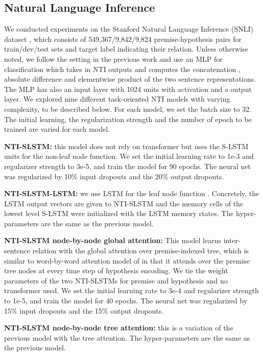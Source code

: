 \documentclass[11pt]{article}
\begin{document}
\subsection{Natural Language Inference}

We conducted experiments on the Stanford Natural Language Inference (SNLI) dataset \cite{bowman:15}, which consists of 549,367/9,842/9,824 premise-hypothesis pairs for train/dev/test sets and target label indicating their relation. Unless otherwise noted, we follow the setting in the previous work \cite{Lili16,BowmanGRGMP16} and use an MLP 
for classification which takes in NTI outputs and computes the concatenation , absolute difference  and elementwise product  of the two sentence representations. The MLP has also an input layer with 1024 units with  activation and a  output layer. We explored nine different task-oriented NTI models with varying complexity, to be described below. For each model, we set the batch size to 32. The initial learning, the regularization strength and the number of epoch to be trained are varied for each model.

\textbf{NTI-SLSTM:} this model does not rely on  transformer but uses the S-LSTM units for the non-leaf node function. We set the initial learning rate to 1e-3 and  regularizer strength to 3e-5, and train the model for 90 epochs. The neural net was regularized by 10\% input dropouts and the 20\% output dropouts. 

\textbf{NTI-SLSTM-LSTM:} we use LSTM for the leaf node function . Concretely, the LSTM output vectors are given to NTI-SLSTM and the memory cells of the lowest level S-LSTM were initialized with the LSTM memory states. The hyper-parameters are the same as the previous model.





\textbf{NTI-SLSTM node-by-node global attention:} This model learns inter-sentence relation with the global attention over premise-indexed tree, which is similar to word-by-word attention model of  in that it attends over the premise tree nodes at every time step of hypothesis encoding. We tie the weight parameters of the two NTI-SLSTMs for premise and hypothesis and no  transformer used. We set the initial learning rate to 3e-4 and  regularizer strength to 1e-5, and train the model for 40 epochs. The neural net was regularized by 15\% input dropouts and the 15\% output dropouts.


\textbf{NTI-SLSTM node-by-node tree attention:} this is a variation of the previous model with the tree attention. The hyper-parameters are the same as the previous model.
\end{document}
